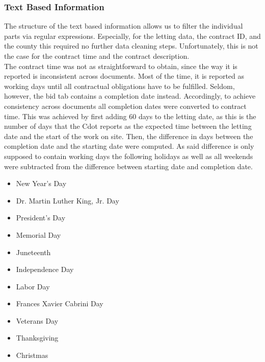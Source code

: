 \documentclass[a4paper,12pt, headsepline]{scrartcl}
\numberwithin{equation}{section}
\begin{document}
\subsubsection{Text Based Information}\label{subsubsec:descr}
 The structure of the text based information allows us to filter the individual parts via regular expressions. Especially, for the letting data, the contract ID, and the county this required no further data cleaning steps. Unfortunately, this is not the case for the contract time and the contract description.\\ 
 The contract time was not as straightforward to obtain, since the way it is reported is inconsistent across documents. Most of the time, it is reported as working days until all contractual obligations have to be fulfilled. Seldom, however, the bid tab contains a completion date instead. Accordingly, to achieve consistency across documents all completion dates were converted to contract time. This was achieved by first adding 60 days to the letting date, as this is the number of days that the Cdot reports as the expected time between the letting date and the start of the work on site. Then, the difference in days between the completion date and the starting date were computed. As said difference is only supposed to contain working days the following holidays as well as all weekends were subtracted from the difference between starting date and completion date.
 
 \begin{itemize}
 	\item New Year's Day
 	\item Dr. Martin Luther King, Jr. Day
 	\item President's Day
 	\item Memorial Day
 	\item Juneteenth
 	\item Independence Day
 	\item Labor Day
 	\item Frances Xavier Cabrini Day
 	\item Veterans Day
 	\item Thanksgiving
 	\item Christmas
 \end{itemize}
 
\end{document}
